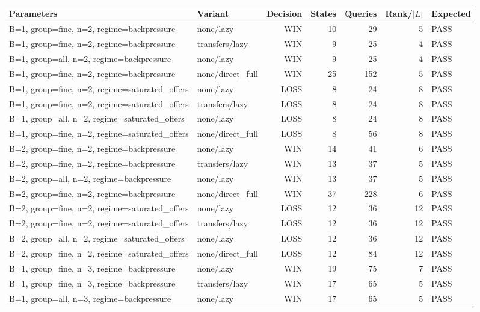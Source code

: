 \begin{longtable}{llrrrrl}
\toprule
Parameters & Variant & Decision & States & Queries & Rank/$|L|$ & Expected \\
\midrule
\endhead
B=1, group=fine, n=2, regime=backpressure & none/lazy & WIN & 10 & 29 & 5 & PASS \\
B=1, group=fine, n=2, regime=backpressure & transfers/lazy & WIN & 9 & 25 & 4 & PASS \\
B=1, group=all, n=2, regime=backpressure & none/lazy & WIN & 9 & 25 & 4 & PASS \\
B=1, group=fine, n=2, regime=backpressure & none/direct\_full & WIN & 25 & 152 & 5 & PASS \\
B=1, group=fine, n=2, regime=saturated\_offers & none/lazy & LOSS & 8 & 24 & 8 & PASS \\
B=1, group=fine, n=2, regime=saturated\_offers & transfers/lazy & LOSS & 8 & 24 & 8 & PASS \\
B=1, group=all, n=2, regime=saturated\_offers & none/lazy & LOSS & 8 & 24 & 8 & PASS \\
B=1, group=fine, n=2, regime=saturated\_offers & none/direct\_full & LOSS & 8 & 56 & 8 & PASS \\
B=2, group=fine, n=2, regime=backpressure & none/lazy & WIN & 14 & 41 & 6 & PASS \\
B=2, group=fine, n=2, regime=backpressure & transfers/lazy & WIN & 13 & 37 & 5 & PASS \\
B=2, group=all, n=2, regime=backpressure & none/lazy & WIN & 13 & 37 & 5 & PASS \\
B=2, group=fine, n=2, regime=backpressure & none/direct\_full & WIN & 37 & 228 & 6 & PASS \\
B=2, group=fine, n=2, regime=saturated\_offers & none/lazy & LOSS & 12 & 36 & 12 & PASS \\
B=2, group=fine, n=2, regime=saturated\_offers & transfers/lazy & LOSS & 12 & 36 & 12 & PASS \\
B=2, group=all, n=2, regime=saturated\_offers & none/lazy & LOSS & 12 & 36 & 12 & PASS \\
B=2, group=fine, n=2, regime=saturated\_offers & none/direct\_full & LOSS & 12 & 84 & 12 & PASS \\
B=1, group=fine, n=3, regime=backpressure & none/lazy & WIN & 19 & 75 & 7 & PASS \\
B=1, group=fine, n=3, regime=backpressure & transfers/lazy & WIN & 17 & 65 & 5 & PASS \\
B=1, group=all, n=3, regime=backpressure & none/lazy & WIN & 17 & 65 & 5 & PASS \\

\end{longtable}
